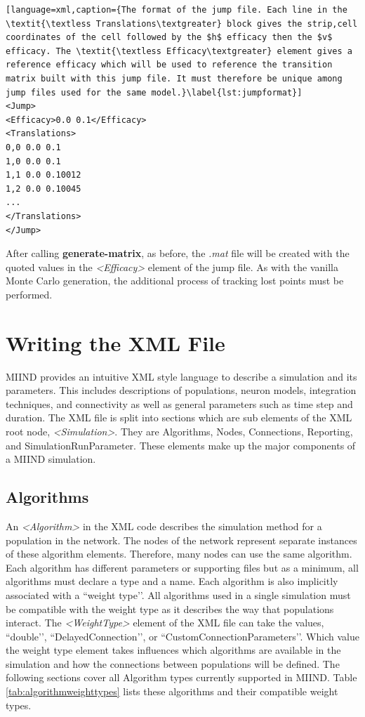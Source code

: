 \documentclass[utf8]{frontiersSCNS} %
\begin{document}
\begin{lstlisting}[language=xml,caption={The format of the jump file. Each line in the  \textit{\textless Translations\textgreater} block gives the strip,cell coordinates of the cell followed by the $h$ efficacy then the $v$ efficacy. The \textit{\textless Efficacy\textgreater} element gives a reference efficacy which will be used to reference the transition matrix built with this jump file. It must therefore be unique among jump files used for the same model.}\label{lst:jumpformat}]
<Jump>
<Efficacy>0.0 0.1</Efficacy>
<Translations>
0,0	0.0	0.1
1,0	0.0	0.1
1,1	0.0	0.10012
1,2	0.0	0.10045
...
</Translations>
</Jump>
\end{lstlisting}

After calling \textbf{generate-matrix}, as before, the \textit{.mat} file will be created with the quoted values in the \textit{\textless Efficacy\textgreater} element of the jump file. As with the vanilla Monte Carlo generation, the additional process of tracking lost points must be performed. 

\section{Writing the XML File}
\label{section:xmlfile}
MIIND provides an intuitive XML style language to describe a simulation and its parameters. This includes descriptions of populations, neuron models, integration techniques, and connectivity as well as general parameters such as time step and duration. The XML file is split into sections which are sub elements of the XML root node, \textit{\textless Simulation\textgreater}. They are Algorithms, Nodes, Connections, Reporting, and SimulationRunParameter. These elements make up the major components of a MIIND simulation.

\subsection{Algorithms}

An \textit{\textless Algorithm\textgreater} in the XML code describes the simulation method for a population in the network. The nodes of the network represent separate instances of these algorithm elements. Therefore, many nodes can use the same algorithm. Each algorithm has different parameters or supporting files but as a minimum, all algorithms must declare a type and a name. Each algorithm is also implicitly associated with a ``weight type’’. All algorithms used in a single simulation must be compatible with the weight type as it describes the way that populations interact. The \textit{\textless WeightType\textgreater} element of the XML file can take the values, ``double’’, ``DelayedConnection’’, or ``CustomConnectionParameters’’. Which value the weight type element takes influences which algorithms are available in the simulation and how the connections between populations will be defined. The following sections cover all Algorithm types currently supported in MIIND. Table \ref{tab:algorithmweighttypes} lists these algorithms and their compatible weight types.
\end{document}
